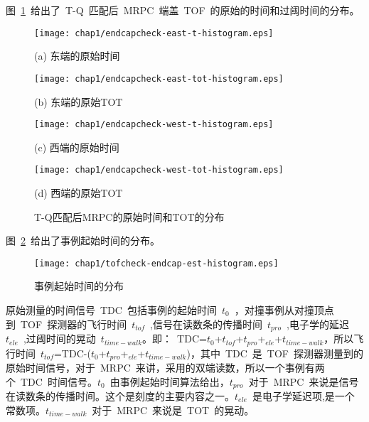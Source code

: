 图~\ref{fig:T and Q}~给出了~T-Q~匹配后~MRPC~端盖~TOF~的原始的时间和过阈时间的分布。
\begin{figure}[!h]
\begin{minipage}{0.48\linewidth}
  \centerline{ \centering \texttt{[image: chap1/endcapcheck-east-t-histogram.eps]}}
  \centerline{(a) 东端的原始时间}
  \centerline{\label{fig:endcapcheck-east-t-histogram}}
\end{minipage}
\begin{minipage}{0.48\linewidth}
  \centerline{ \centering \texttt{[image: chap1/endcapcheck-east-tot-histogram.eps]}}
  \centerline{(b) 东端的原始TOT}
  \centerline{\label{fig:endcapcheck-east-tot-histogram}}
\end{minipage}
\vfill
\begin{minipage}{0.48\linewidth}
  \centerline{ \centering  \texttt{[image: chap1/endcapcheck-west-t-histogram.eps]}}
  \centerline{(c) 西端的原始时间}
  \centerline{\label{fig:endcapcheck-west-t-histogram}}
\end{minipage}
\begin{minipage}{0.48\linewidth}
  \centerline{ \centering \texttt{[image: chap1/endcapcheck-west-tot-histogram.eps]}}
  \centerline{(d) 西端的原始TOT}
  \centerline{\label{fig:endcapcheck-west-tot-histogram}}
\end{minipage}
\caption{T-Q匹配后MRPC的原始时间和TOT的分布}
\label{fig:T and Q}
\end{figure}

图~\ref{fig:tofcheck-endcap-est-histogram}~给出了事例起始时间的分布。
\begin{figure}[!h]
  \centering
  \texttt{[image: chap1/tofcheck-endcap-est-histogram.eps]}
  \caption{事例起始时间的分布}
  \label{fig:tofcheck-endcap-est-histogram}
\end{figure}

原始测量的时间信号~TDC~包括事例的起始时间~$t_{0}$~，对撞事例从对撞顶点到~TOF~探测器的飞行时间~$t_{tof}$~,信号在读数条的传播时间~$t_{pro}$~,电子学的延迟~$t_{ele}$~,过阈时间的晃动~$t_{time-walk}$。即：~TDC=$t_{0}$+$t_{tof}$+$t_{pro}$+$_{ele}$+$t_{time-walk}$，所以飞行时间~$t_{tof}$=TDC-($t_{0}$+$t_{pro}$+$_{ele}$+$t_{time-walk}$)，其中~TDC~是~TOF~探测器测量到的原始时间信号，对于~MRPC~来讲，采用的双端读数，所以一个事例有两个~TDC~时间信号。$t_{0}$~由事例起始时间算法给出，$t_{pro}$~对于~MRPC~来说是信号在读数条的传播时间。这个是刻度的主要内容之一。$t_{ele}$~是电子学延迟项,是一个常数项。$t_{time-walk}$~对于~MRPC~来说是~TOT~的晃动。
